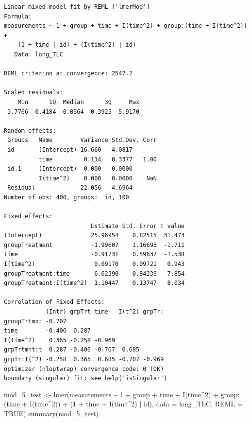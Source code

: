 \documentclass[
  letterpaper,
  DIV=11,
  numbers=noendperiod]{scrreprt}
\newenvironment{Shaded}{\begin{snugshade}}{\end{snugshade}}
\newcommand{\AttributeTok}[1]{\textcolor[rgb]{0.40,0.45,0.13}{#1}}
\newcommand{\ConstantTok}[1]{\textcolor[rgb]{0.56,0.35,0.01}{#1}}
\newcommand{\DecValTok}[1]{\textcolor[rgb]{0.68,0.00,0.00}{#1}}
\newcommand{\FunctionTok}[1]{\textcolor[rgb]{0.28,0.35,0.67}{#1}}
\newcommand{\NormalTok}[1]{\textcolor[rgb]{0.00,0.23,0.31}{#1}}
\newcommand{\OtherTok}[1]{\textcolor[rgb]{0.00,0.23,0.31}{#1}}
\newcommand{\SpecialCharTok}[1]{\textcolor[rgb]{0.37,0.37,0.37}{#1}}
\begin{document}
\begin{verbatim}
Linear mixed model fit by REML ['lmerMod']
Formula: 
measurements ~ 1 + group + time + I(time^2) + group:(time + I(time^2)) +  
    (1 + time | id) + (I(time^2) | id)
   Data: long_TLC

REML criterion at convergence: 2547.2

Scaled residuals: 
    Min      1Q  Median      3Q     Max 
-3.7766 -0.4184 -0.0564  0.3925  5.9170 

Random effects:
 Groups   Name        Variance Std.Dev. Corr
 id       (Intercept) 16.660   4.0817       
          time         0.114   0.3377   1.00
 id.1     (Intercept)  0.000   0.0000       
          I(time^2)    0.000   0.0000    NaN
 Residual             22.056   4.6964       
Number of obs: 400, groups:  id, 100

Fixed effects:
                         Estimate Std. Error t value
(Intercept)              25.96954    0.82515  31.473
groupTreatment           -1.99607    1.16693  -1.711
time                     -0.91731    0.59637  -1.538
I(time^2)                 0.09170    0.09721   0.943
groupTreatment:time      -6.62390    0.84339  -7.854
groupTreatment:I(time^2)  1.10447    0.13747   8.034

Correlation of Fixed Effects:
            (Intr) grpTrt time   I(t^2) grpTr:
groupTrtmnt -0.707                            
time        -0.406  0.287                     
I(time^2)    0.365 -0.258 -0.969              
grpTrtmnt:t  0.287 -0.406 -0.707  0.685       
grpTr:I(^2) -0.258  0.365  0.685 -0.707 -0.969
optimizer (nloptwrap) convergence code: 0 (OK)
boundary (singular) fit: see help('isSingular')
\end{verbatim}

\begin{Shaded}
\begin{Highlighting}[]
\NormalTok{mod\_5\_test }\OtherTok{\textless{}{-}} \FunctionTok{lmer}\NormalTok{(measurements }\SpecialCharTok{\textasciitilde{}} \DecValTok{1} \SpecialCharTok{+}\NormalTok{ group }\SpecialCharTok{+}\NormalTok{ time }\SpecialCharTok{+} \FunctionTok{I}\NormalTok{(time}\SpecialCharTok{\^{}}\DecValTok{2}\NormalTok{) }\SpecialCharTok{+}\NormalTok{ group}\SpecialCharTok{:}\NormalTok{(time }\SpecialCharTok{+} \FunctionTok{I}\NormalTok{(time}\SpecialCharTok{\^{}}\DecValTok{2}\NormalTok{)) }\SpecialCharTok{+}
\NormalTok{    (}\DecValTok{1} \SpecialCharTok{+}\NormalTok{ time }\SpecialCharTok{+} \FunctionTok{I}\NormalTok{(time}\SpecialCharTok{\^{}}\DecValTok{2}\NormalTok{) }\SpecialCharTok{|}\NormalTok{ id), }\AttributeTok{data =}\NormalTok{ long\_TLC, }\AttributeTok{REML =} \ConstantTok{TRUE}\NormalTok{)}
\FunctionTok{summary}\NormalTok{(mod\_5\_test)}
\end{Highlighting}
\end{Shaded}
\end{document}
